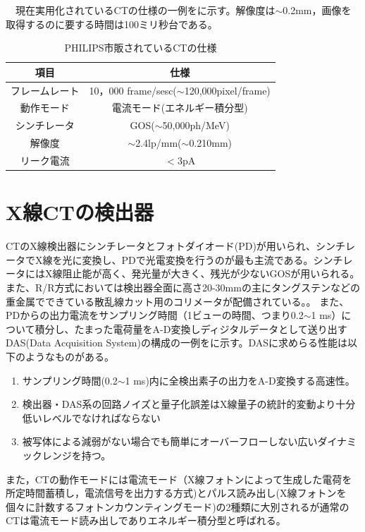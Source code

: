 \ \ 現在実用化されているCTの仕様の一例をに示す。解像度は$\sim$0.2mm，画像を取得するのに要する時間は100ミリ秒台である。
\begin{table}[H]
\begin{center}
\begin{tabular}{cc} \hline
項目 & 仕様 \\\hline
フレームレート & 10，000 frame/sesc($\sim$120,000pixel/frame) \\
動作モード & 電流モード(エネルギー積分型) \\
シンチレータ & GOS($\sim$50,000ph/MeV) \\
解像度 & $\sim$2.4lp/mm($\sim$0.210mm) \\
リーク電流 & $<3$pA \\\hline
\end{tabular}
\end{center}
\caption{PHILIPS市販されているCTの仕様\cite{philips}}
\label{CT_philips}
\end{table}



\section{X線CTの検出器}
CTのX線検出器にシンチレータとフォトダイオード(PD)が用いられ、シンチレータでX線を光に変換し、PDで光電変換を行うのが最も主流である。シンチレータにはX線阻止能が高く、発光量が大きく、残光が少ないGOSが用いられる。また、R/R方式においては検出器全面に高さ20-30mmの主にタングステンなどの重金属でできている散乱線カット用のコリメータが配備されている。。
また、PDからの出力電流をサンプリング時間（1ビューの時間、つまり0.2$\sim$1 ms）について積分し、たまった電荷量をA-D変換しディジタルデータとして送り出すDAS(Data Acquisition System)の構成の一例をに示す。DASに求めらる性能は以下のようなものがある。
\begin{enumerate}
\item サンプリング時間(0.2$\sim$1 ms)内に全検出素子の出力をA-D変換する高速性。
\item 検出器・DAS系の回路ノイズと量子化誤差はX線量子の統計的変動より十分低いレベルでなければならない
\item 被写体による減弱がない場合でも簡単にオーバーフローしない広いダイナミックレンジを持つ。
\end{enumerate}



また，CTの動作モードには電流モード（X線フォトンによって生成した電荷を所定時間蓄積し，電流信号を出力する方式)とパルス読み出し(X線フォトンを個々に計数するフォトンカウンティングモード)の2種類に大別されるが通常のCTは電流モード読み出しでありエネルギー積分型と呼ばれる。






